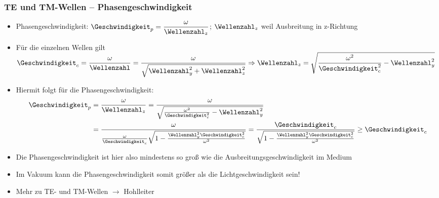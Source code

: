 \begin{frame}
  \frametitle{TE und TM-Wellen -- Phasengeschwindigkeit}
  \begin{itemize}[<+->]
  \item Phasengeschwindigkeit: \( \Geschwindigkeit_p = \dfrac{\omega}{\Wellenzahl_z}\); \(\Wellenzahl_z\) weil Ausbreitung in z-Richtung
  \item Für die einzelnen Wellen gilt \(\Geschwindigkeit_c = \dfrac{\omega}{\Wellenzahl} = \dfrac{\omega}{\sqrt{\Wellenzahl_y^2+\Wellenzahl_z^2}} \Rightarrow \Wellenzahl_z = \sqrt{\dfrac{\omega^2}{\Geschwindigkeit_c^2}-\Wellenzahl_y^2 }\)
  \item Hiermit folgt für die Phasengeschwindigkeit:
    \begin{align*}
      \Geschwindigkeit_p & = \frac{\omega}{\Wellenzahl_z} = \frac{\omega}{\sqrt{\frac{\omega^2}{\Geschwindigkeit_c^2}-\Wellenzahl_y^2 }} \\
                & = \frac{\omega}{\frac{\omega}{\Geschwindigkeit_c}\sqrt{1-\frac{\Wellenzahl_y^2 \Geschwindigkeit_c^2}{\omega^2} }} = \frac{\Geschwindigkeit_c}{\sqrt{1-\frac{\Wellenzahl_y^2 \Geschwindigkeit_c^2}{\omega^2} }} \ge \Geschwindigkeit_c 
      \end{align*}
    \item Die Phasengeschwindigkeit ist hier also mindestens so groß wie die Ausbreitungsgeschwindigkeit im Medium
    \item Im Vakuum kann die Phasengeschwindigkeit somit \alert{größer als die Lichtgeschwindigkeit} sein!
      \item Mehr zu TE- und TM-Wellen \(\to\) \alert{Hohlleiter} 
    \end{itemize}
\end{frame}
  

   
